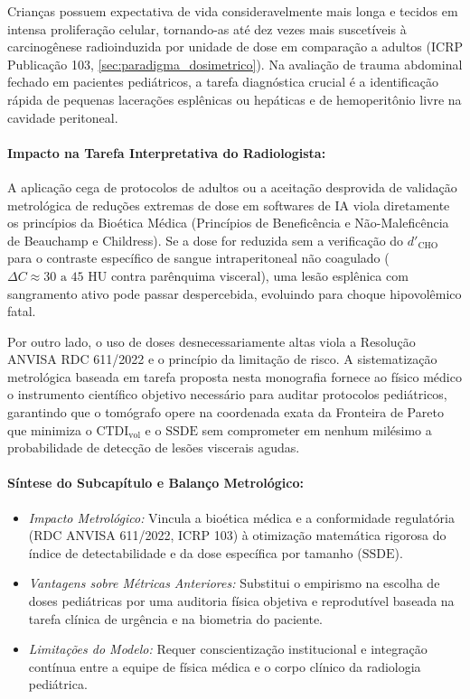 \documentclass[
  12pt,
  a4paper,
  oneside
]{report}
\begin{document}
Crianças possuem expectativa de vida consideravelmente mais longa e tecidos em intensa proliferação celular, tornando-as até dez vezes mais suscetíveis à carcinogênese radioinduzida por unidade de dose em comparação a adultos (ICRP Publicação 103, \cref{sec:paradigma_dosimetrico}). Na avaliação de trauma abdominal fechado em pacientes pediátricos, a tarefa diagnóstica crucial é a identificação rápida de pequenas lacerações esplênicas ou hepáticas e de hemoperitônio livre na cavidade peritoneal.

\paragraph{Impacto na Tarefa Interpretativa do Radiologista:} A aplicação cega de protocolos de adultos ou a aceitação desprovida de validação metrológica de reduções extremas de dose em softwares de IA viola diretamente os princípios da Bioética Médica (Princípios de Beneficência e Não-Maleficência de Beauchamp e Childress). Se a dose for reduzida sem a verificação do $d'_{\text{CHO}}$ para o contraste específico de sangue intraperitoneal não coagulado ($\Delta C \approx 30\text{ a } 45\text{ HU}$ contra parênquima visceral), uma lesão esplênica com sangramento ativo pode passar despercebida, evoluindo para choque hipovolêmico fatal.

Por outro lado, o uso de doses desnecessariamente altas viola a Resolução ANVISA RDC 611/2022 e o princípio da limitação de risco. A sistematização metrológica baseada em tarefa proposta nesta monografia fornece ao físico médico o instrumento científico objetivo necessário para auditar protocolos pediátricos, garantindo que o tomógrafo opere na coordenada exata da Fronteira de Pareto que minimiza o $\text{CTDI}_{\text{vol}}$ e o $\text{SSDE}$ sem comprometer em nenhum milésimo a probabilidade de detecção de lesões viscerais agudas.

\paragraph{Síntese do Subcapítulo e Balanço Metrológico:}
\begin{itemize}
  \item \emph{Impacto Metrológico:} Vincula a bioética médica e a conformidade regulatória (RDC ANVISA 611/2022, ICRP 103) à otimização matemática rigorosa do índice de detectabilidade e da dose específica por tamanho ($\text{SSDE}$).
  \item \emph{Vantagens sobre Métricas Anteriores:} Substitui o empirismo na escolha de doses pediátricas por uma auditoria física objetiva e reprodutível baseada na tarefa clínica de urgência e na biometria do paciente.
  \item \emph{Limitações do Modelo:} Requer conscientização institucional e integração contínua entre a equipe de física médica e o corpo clínico da radiologia pediátrica.
\end{itemize}
\end{document}
